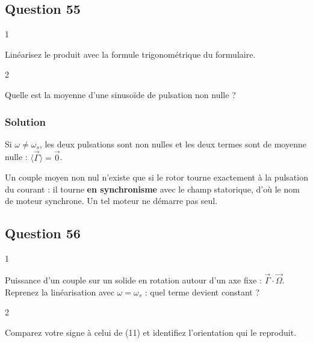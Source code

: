 \documentclass[11pt,a4paper]{article}
\newcommand{\equationajustee}[1]{%
  \sbox{\boiteequation}{$\displaystyle #1$}%
  \ifdim\wd\boiteequation>\linewidth
    \[\resizebox{\linewidth}{!}{\usebox{\boiteequation}}\]%
  \else
    \[#1\]%
  \fi}
\begin{document}
\hypertarget{question-55}{%
\subsection{Question 55}\label{question-55}}

\begin{indication}{1}

Linéarisez le produit avec la formule trigonométrique du formulaire.

\end{indication}

\begin{indication}{2}

Quelle est la moyenne d'une sinusoïde de pulsation non nulle ?

\end{indication}

\hypertarget{solution-54}{%
\subsubsection{Solution}\label{solution-54}}

\equationajustee{\cos(\omega t)\sin(\omega_st+\theta_0)=\frac12\left[\sin\left((\omega+\omega_s)t+\theta_0\right)-\sin\left((\omega-\omega_s)t-\theta_0\right)\right].}
Si \(\omega\neq\omega_s\), les deux pulsations sont non nulles et les deux termes sont de moyenne nulle : \(\langle\vec\Gamma\rangle=\vec0\).

Un couple moyen non nul n'existe que si le rotor tourne exactement à la pulsation du courant : il tourne \textbf{en synchronisme} avec le champ statorique, d'où le nom de moteur synchrone. Un tel moteur ne démarre pas seul.

\hypertarget{question-56}{%
\subsection{Question 56}\label{question-56}}

\begin{indication}{1}

Puissance d'un couple sur un solide en rotation autour d'un axe fixe : \(\vec\Gamma\cdot\vec\Omega\). Reprenez la linéarisation avec \(\omega=\omega_s\) : quel terme devient constant ?

\end{indication}

\begin{indication}{2}

Comparez votre signe à celui de (11) et identifiez l'orientation qui le reproduit.

\end{indication}
\end{document}
